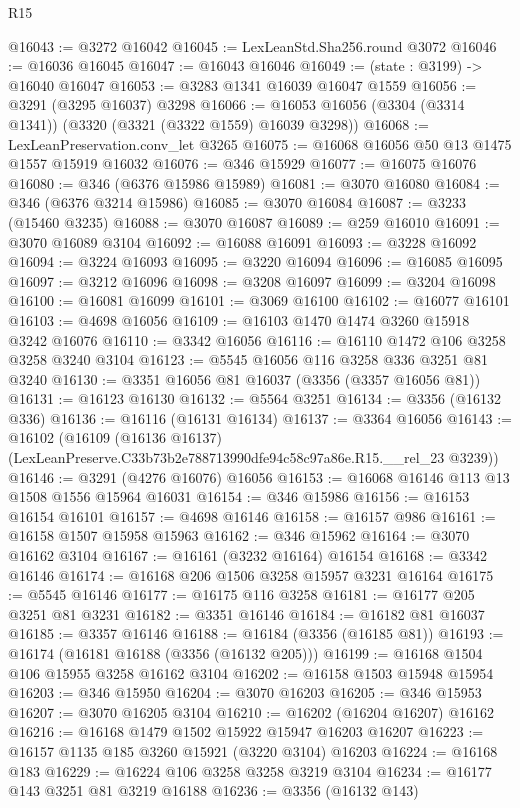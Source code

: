 \begin{lexlean}{R15}
\begin{coremodule}
@16043 := @3272 @16042
@16045 := LexLeanStd.Sha256.round @3072
@16046 := @16036 @16045
@16047 := @16043 @16046
@16049 := (state : @3199) -> @16040 @16047
@16053 := @3283 @1341 @16039 @16047 @1559
@16056 := @3291 (@3295 @16037) @3298
@16066 := @16053 @16056 (@3304 (@3314 @1341)) (@3320 (@3321 (@3322 @1559) @16039 @3298))
@16068 := LexLeanPreservation.conv_let @3265
@16075 := @16068 @16056 @50 @13 @1475 @1557 @15919 @16032
@16076 := @346 @15929
@16077 := @16075 @16076
@16080 := @346 (@6376 @15986 @15989)
@16081 := @3070 @16080
@16084 := @346 (@6376 @3214 @15986)
@16085 := @3070 @16084
@16087 := @3233 (@15460 @3235)
@16088 := @3070 @16087
@16089 := @259 @16010
@16091 := @3070 @16089 @3104
@16092 := @16088 @16091
@16093 := @3228 @16092
@16094 := @3224 @16093
@16095 := @3220 @16094
@16096 := @16085 @16095
@16097 := @3212 @16096
@16098 := @3208 @16097
@16099 := @3204 @16098
@16100 := @16081 @16099
@16101 := @3069 @16100
@16102 := @16077 @16101
@16103 := @4698 @16056
@16109 := @16103 @1470 @1474 @3260 @15918 @3242 @16076
@16110 := @3342 @16056
@16116 := @16110 @1472 @106 @3258 @3258 @3240 @3104
@16123 := @5545 @16056 @116 @3258 @336 @3251 @81 @3240
@16130 := @3351 @16056 @81 @16037 (@3356 (@3357 @16056 @81))
@16131 := @16123 @16130
@16132 := @5564 @3251
@16134 := @3356 (@16132 @336)
@16136 := @16116 (@16131 @16134)
@16137 := @3364 @16056
@16143 := @16102
    (@16109 (@16136 @16137) (LexLeanPreserve.C33b73b2e788713990dfe94c58c97a86e.R15.__rel_23 @3239))
@16146 := @3291 (@4276 @16076) @16056
@16153 := @16068 @16146 @113 @13 @1508 @1556 @15964 @16031
@16154 := @346 @15986
@16156 := @16153 @16154 @16101
@16157 := @4698 @16146
@16158 := @16157 @986
@16161 := @16158 @1507 @15958 @15963
@16162 := @346 @15962
@16164 := @3070 @16162 @3104
@16167 := @16161 (@3232 @16164) @16154
@16168 := @3342 @16146
@16174 := @16168 @206 @1506 @3258 @15957 @3231 @16164
@16175 := @5545 @16146
@16177 := @16175 @116 @3258
@16181 := @16177 @205 @3251 @81 @3231
@16182 := @3351 @16146
@16184 := @16182 @81 @16037
@16185 := @3357 @16146
@16188 := @16184 (@3356 (@16185 @81))
@16193 := @16174 (@16181 @16188 (@3356 (@16132 @205)))
@16199 := @16168 @1504 @106 @15955 @3258 @16162 @3104
@16202 := @16158 @1503 @15948 @15954
@16203 := @346 @15950
@16204 := @3070 @16203
@16205 := @346 @15953
@16207 := @3070 @16205 @3104
@16210 := @16202 (@16204 @16207) @16162
@16216 := @16168 @1479 @1502 @15922 @15947 @16203 @16207
@16223 := @16157 @1135 @185 @3260 @15921 (@3220 @3104) @16203
@16224 := @16168 @183
@16229 := @16224 @106 @3258 @3258 @3219 @3104
@16234 := @16177 @143 @3251 @81 @3219 @16188
@16236 := @3356 (@16132 @143)

\end{coremodule}
\end{lexlean}
